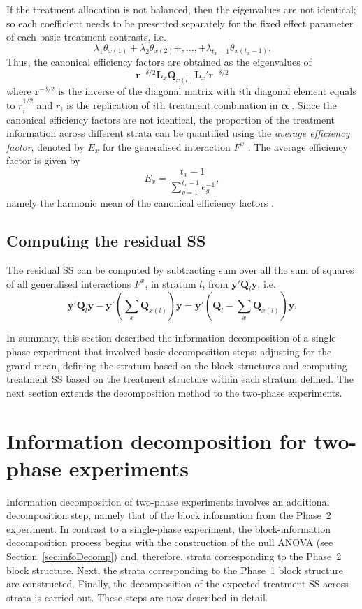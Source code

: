 \documentclass[article]{jss}
\newcommand{\Q}{\mathbf{Q}}
\newcommand{\mL}{\mathbf{L}}
\begin{document}
If the treatment allocation is not balanced, then the eigenvalues are not identical; so each coefficient needs to be presented separately for the fixed effect parameter of each basic treatment contrasts, i.e.\
\[\lambda_1 \theta_{x(1)} + \lambda_2 \theta_{x(2)} +, \dots , + \lambda_{t_x - 1} \theta_{x(t_x - 1)}. \] 
Thus, the canonical efficiency factors are obtained as the eigenvalues of 
\begin{equation}
	\bm{r}^{-\delta/2} \mL_{x}\Q_{x(l)} \mL_{x}' \bm{r}^{-\delta/2}
\end{equation}
where $\bm{r}^{-\delta/2}$ is the inverse of the diagonal matrix with $i$th diagonal element equals to $r_i^{1/2}$ and $r_i$ is the replication of $i$th treatment combination in $\bm{\alpha}$ \citep{John1987}. Since the canonical efficiency factors are not identical, the proportion of the treatment information across different strata can be quantified using the \emph{average efficiency factor}, denoted by $E_x$ for the generalised interaction $F^x$ \citep{Yates1936}. The average efficiency factor is given by
\begin{equation}\label{eq:aveEff}
	E_x = \dfrac{t_x - 1}{\sum^{t_x - 1}_{g = 1} e_g^{-1}},
\end{equation}
namely the harmonic mean of the canonical efficiency factors \citep{John1987}. 
 
\subsection{Computing the residual SS}
The residual SS can be computed by subtracting sum over all the sum of squares of all generalised interactions $F^{x}$, in stratum $l$, from $\bm{y}' \Q_l \bm{y}$, i.e.\ 
\begin{equation}
\label{eq:resSS}
\bm{y}' \Q_l\bm{y} - \bm{y}' \left( \sum_x \Q_{x(l)} \right) \bm{y} = \bm{y}' \left( \Q_l -  \sum_x \Q_{x(l)}\right)\bm{y}.
\end{equation}

In summary, this section described the information decomposition of a single-phase experiment that involved basic decomposition steps: adjusting for the grand mean, defining the stratum based on the block structures and computing treatment SS based on the treatment structure within each stratum defined. The next section extends the decomposition method to the two-phase experiments.  

\section{Information decomposition for two-phase experiments} 
\label{sec:infoiDecompTwoPase}
Information decomposition of two-phase experiments involves an additional decomposition step, namely that of the block information from the Phase~2 experiment. In contrast to a single-phase experiment, the block-information decomposition process begins with the construction of the null ANOVA (see Section~\ref{sec:infoDecomp}) and, therefore, strata corresponding to the Phase~2 block structure. Next, the strata corresponding to the Phase~1 block structure are constructed. Finally, the decomposition of the expected treatment SS across strata is carried out. These steps are now described in detail.
\end{document}
